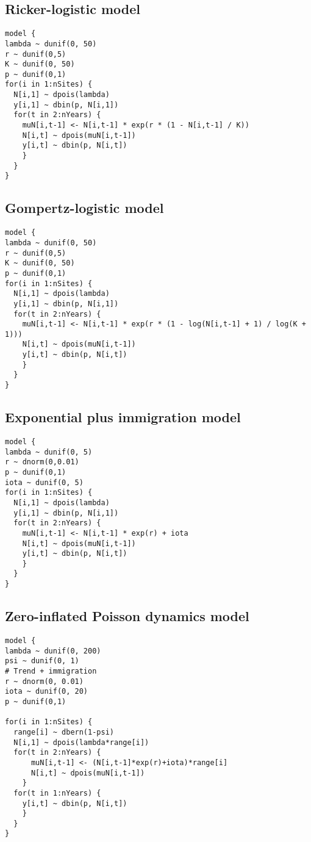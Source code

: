 \documentclass[12pt]{article}
\begin{document}
\subsection{Ricker-logistic model}
\begin{verbatim}
model {
lambda ~ dunif(0, 50)
r ~ dunif(0,5)
K ~ dunif(0, 50)
p ~ dunif(0,1)
for(i in 1:nSites) {
  N[i,1] ~ dpois(lambda)
  y[i,1] ~ dbin(p, N[i,1])
  for(t in 2:nYears) {
    muN[i,t-1] <- N[i,t-1] * exp(r * (1 - N[i,t-1] / K))
    N[i,t] ~ dpois(muN[i,t-1])
    y[i,t] ~ dbin(p, N[i,t])
    }
  }
}
\end{verbatim}

\subsection{Gompertz-logistic model}
\begin{verbatim}
model {
lambda ~ dunif(0, 50)
r ~ dunif(0,5)
K ~ dunif(0, 50)
p ~ dunif(0,1)
for(i in 1:nSites) {
  N[i,1] ~ dpois(lambda)
  y[i,1] ~ dbin(p, N[i,1])
  for(t in 2:nYears) {
    muN[i,t-1] <- N[i,t-1] * exp(r * (1 - log(N[i,t-1] + 1) / log(K + 1)))
    N[i,t] ~ dpois(muN[i,t-1])
    y[i,t] ~ dbin(p, N[i,t])
    }
  }
}
\end{verbatim}

\subsection{Exponential plus immigration model}
\begin{verbatim}
model {
lambda ~ dunif(0, 5)
r ~ dnorm(0,0.01)
p ~ dunif(0,1)
iota ~ dunif(0, 5)
for(i in 1:nSites) {
  N[i,1] ~ dpois(lambda)
  y[i,1] ~ dbin(p, N[i,1])
  for(t in 2:nYears) {
    muN[i,t-1] <- N[i,t-1] * exp(r) + iota
    N[i,t] ~ dpois(muN[i,t-1])
    y[i,t] ~ dbin(p, N[i,t])
    }
  }
}
\end{verbatim}

\subsection{Zero-inflated Poisson dynamics model}
\begin{verbatim}
model {
lambda ~ dunif(0, 200)
psi ~ dunif(0, 1)
# Trend + immigration
r ~ dnorm(0, 0.01)
iota ~ dunif(0, 20)
p ~ dunif(0,1)

for(i in 1:nSites) {
  range[i] ~ dbern(1-psi)
  N[i,1] ~ dpois(lambda*range[i])
  for(t in 2:nYears) {
      muN[i,t-1] <- (N[i,t-1]*exp(r)+iota)*range[i]
      N[i,t] ~ dpois(muN[i,t-1])
    }
  for(t in 1:nYears) {
    y[i,t] ~ dbin(p, N[i,t])
    }
  }
}
\end{verbatim}
\end{document}

